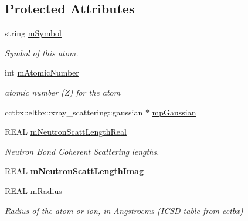 \subsection*{Protected Attributes}
\begin{DoxyCompactItemize}
\item 
string \mbox{\hyperlink{class_obj_cryst_1_1_scattering_power_atom_a8716898711ea10436334ec4a970c32a6}{m\+Symbol}}
\begin{DoxyCompactList}\small\item\em Symbol of this atom. \end{DoxyCompactList}\item 
\mbox{\label{class_obj_cryst_1_1_scattering_power_atom_ac849eb1448632e3866014aa66dc90805}} 
int \mbox{\hyperlink{class_obj_cryst_1_1_scattering_power_atom_ac849eb1448632e3866014aa66dc90805}{m\+Atomic\+Number}}
\begin{DoxyCompactList}\small\item\em atomic number (Z) for the atom \end{DoxyCompactList}\item 
cctbx\+::eltbx\+::xray\+\_\+scattering\+::gaussian $\ast$ \mbox{\hyperlink{class_obj_cryst_1_1_scattering_power_atom_af5837e83fd8027adcaecde3a5fbb22f2}{mp\+Gaussian}}
\item 
R\+E\+AL \mbox{\hyperlink{class_obj_cryst_1_1_scattering_power_atom_a6a7d7c6614a1894591d0f8223eadd26e}{m\+Neutron\+Scatt\+Length\+Real}}
\begin{DoxyCompactList}\small\item\em Neutron Bond Coherent Scattering lengths. \end{DoxyCompactList}\item 
\mbox{\label{class_obj_cryst_1_1_scattering_power_atom_a2ef56409065b0b7f84f4adae609097fc}} 
R\+E\+AL {\bfseries m\+Neutron\+Scatt\+Length\+Imag}
\item 
\mbox{\label{class_obj_cryst_1_1_scattering_power_atom_a45ddfa693e760f7250764e43425d3928}} 
R\+E\+AL \mbox{\hyperlink{class_obj_cryst_1_1_scattering_power_atom_a45ddfa693e760f7250764e43425d3928}{m\+Radius}}
\begin{DoxyCompactList}\small\item\em Radius of the atom or ion, in Angstroems (I\+C\+SD table from cctbx) \end{DoxyCompactList}\item 

\end{DoxyCompactItemize}
